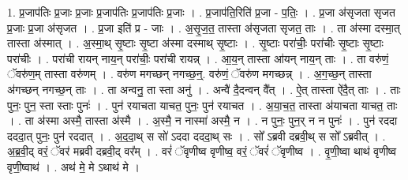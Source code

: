 \documentclass[17pt]{extarticle}
\begin{document}
1. प्र॒जाप॑तिः प्र॒जाः प्र॒जाः प्र॒जाप॑तिः प्र॒जाप॑तिः प्र॒जाः । . प्र॒जाप॑ति॒रिति॑ प्र॒जा - प॒तिः॒ । . प्र॒जा अ॑सृजता सृजत प्र॒जाः प्र॒जा अ॑सृजत । . प्र॒जा इति॑ प्र - जाः । . अ॒सृ॒ज॒त॒ तास्ता अ॑सृजता सृजत॒ ताः । . ता अ॑स्मा दस्मा॒त् तास्ता अ॑स्मात् । . अ॒स्मा॒थ् सृ॒ष्टाः सृ॒ष्टा अ॑स्मा दस्माथ् सृ॒ष्टाः । . सृ॒ष्टाः परा॑चीः॒ परा॑चीः सृ॒ष्टाः सृ॒ष्टाः परा॑चीः । . परा॑ची रायन् नाय॒न् परा॑चीः॒ परा॑ची रायन्न् । . आ॒य॒न् तास्ता आ॑यन् नाय॒न् ताः । . ता वरु॑णं॒ ॅवरु॑ण॒म् तास्ता वरु॑णम् । . वरु॑ण मगच्छन् नगच्छ॒न्॒. वरु॑णं॒ ॅवरु॑ण मगच्छन्न् । . अ॒ग॒च्छ॒न् तास्ता अ॑गच्छन् नगच्छ॒न् ताः । . ता अन्वनु॒ ता स्ता अनु॑ । . अन्वै॑ दै॒दन्वन् वै᳚त् । . ऐ॒त् तास्ता ऐ॑दै॒त् ताः । . ताः पुनः॒ पुन॒ स्ता स्ताः पुनः॑ । . पुन॑ रयाचता याचत॒ पुनः॒ पुन॑ रयाचत । . अ॒या॒च॒त॒ तास्ता अ॑याचता याचत॒ ताः । . ता अ॑स्मा अस्मै॒ तास्ता अ॑स्मै । . अ॒स्मै॒ न नास्मा॑ अस्मै॒ न । . न पुनः॒ पुन॒र् न न पुनः॑ । . पुन॑ रददा दददा॒त् पुनः॒ पुन॑ रददात् । . अ॒द॒दा॒थ् स सो॑ ऽददा दददा॒थ् सः । . सो᳚ ऽब्रवी दब्रवी॒थ् स सो᳚ ऽब्रवीत् । . अ॒ब्र॒वी॒द् वरं॒ ॅवर॑ मब्रवी दब्रवी॒द् वर᳚म् । . वरं॑ ॅवृणीष्व वृणीष्व॒ वरं॒ ॅवरं॑ ॅवृणीष्व । . वृ॒णी॒ष्वा थाथ॑ वृणीष्व वृणी॒ष्वाथ॑ । . अथ॑ मे॒ मे ऽथाथ॑ मे । \newline
\end{document}
